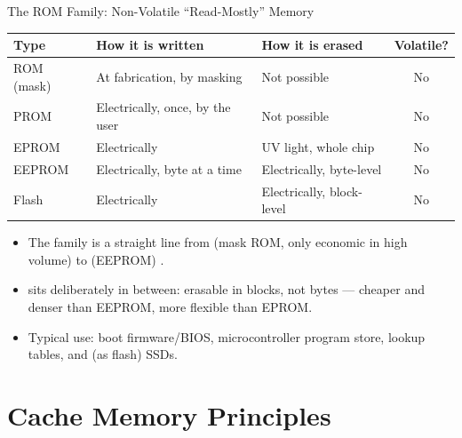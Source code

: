 \documentclass[aspectratio=169]{beamer}
\begin{document}
\begin{frame}{The ROM Family: Non-Volatile ``Read-Mostly'' Memory}
  \footnotesize
  \begin{center}
  \begin{tabular}{@{}lllc@{}}
    \toprule
    \textbf{Type} & \textbf{How it is written} & \textbf{How it is erased} & \textbf{Volatile?} \\
    \midrule
    ROM (mask)  & At fabrication, by masking      & Not possible               & No \\
    PROM        & Electrically, once, by the user & Not possible               & No \\
    EPROM       & Electrically                    & UV light, whole chip       & No \\
    EEPROM      & Electrically, byte at a time    & Electrically, byte-level   & No \\
    Flash       & Electrically                    & Electrically, block-level  & No \\
    \bottomrule
  \end{tabular}
  \end{center}
  \vspace{0.25cm}
  \normalsize
  \begin{itemize}
    \item The family is a straight line from 
      (mask ROM, only economic in high volume) to  (EEPROM)
      \cite[\S6.1, PDF pp.~226--236]{Stallings2015_computer_organization}.
    \item {} sits deliberately in between: erasable in blocks, not
      bytes --- cheaper and denser than EEPROM, more flexible than EPROM.
    \item Typical use: boot firmware/BIOS, microcontroller program store,
      lookup tables, and (as flash) SSDs.
  \end{itemize}
\end{frame}


\section{Cache Memory Principles}
\end{document}
